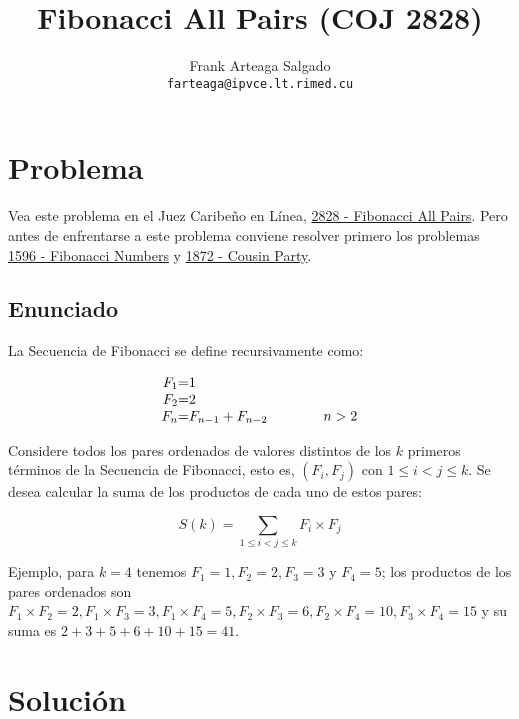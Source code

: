 \documentclass[a4paper,10pt]{article}
\title{Fibonacci All Pairs (COJ 2828)}
\author{Frank Arteaga Salgado\\\texttt{\small farteaga@ipvce.lt.rimed.cu}}
\begin{document}
\maketitle

\section{Problema}

Vea este problema en el Juez Caribe\~no en L\'inea, \href{http://coj.uci.cu/24h/problem.xhtml?pid=2828}{2828 - Fibonacci All Pairs}.
Pero antes de enfrentarse a este problema conviene resolver primero los problemas \href{http://coj.uci.cu/24h/problem.xhtml?pid=1596}{1596 - Fibonacci Numbers} 
y \href{http://coj.uci.cu/24h/problem.xhtml?pid=1872}{1872 - Cousin Party}.

\subsection{Enunciado}
La Secuencia de Fibonacci se define recursivamente como:

\begin{equation}
    \begin{array}{r@{ = }l}
     F_1 & 1\\
     F_2 & 2\\
     F_n & F_{n - 1} + F_{n - 2} \qquad \qquad n > 2 \\
    \end{array}
    \label{fibdef}
\end{equation}

Considere todos los pares ordenados de valores distintos de los $k$ primeros t\'erminos de la 
Secuencia de Fibonacci, esto es, $(F_i, F_j)$ con $1 \le i < j \le k$. Se desea calcular
la suma de los productos de cada uno de estos pares:

$$
 S(k) = \sum_{1 \le i < j \le k} F_i \times F_j
$$

Ejemplo, para $k=4$ tenemos $F_1=1, F_2=2, F_3=3$ y $F_4=5$; los productos de los pares ordenados son 
$F_1 \times F_2 = 2, F_1 \times F_3 = 3, F_1 \times F_4 = 5, F_2 \times F_3 = 6, F_2 \times F_4 = 10, F_3 \times F_4 = 15$ y su suma es 
$2+3+5+6+10+15=41$.
 
\section{Soluci\'on}
\end{document}
